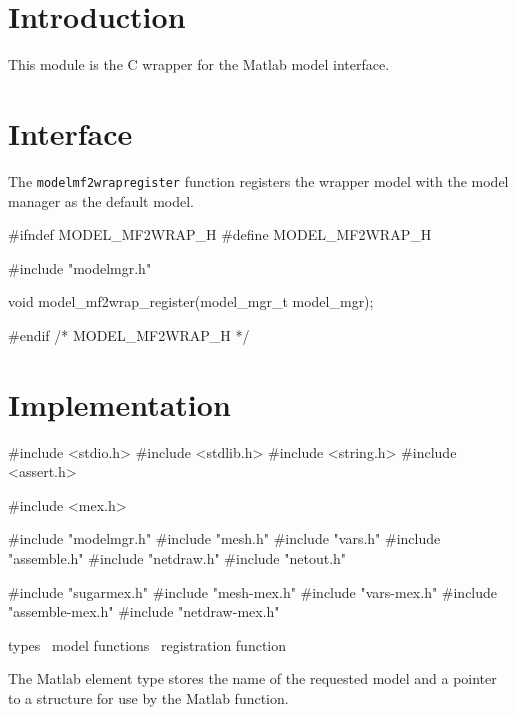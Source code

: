 
\section{Introduction}

This module is the C wrapper for the Matlab model interface.


\section{Interface}

The {\tt{}model{}mf2wrap{}register} function registers the wrapper model with
the model manager as the default model.

\endmoddef
#ifndef MODEL_MF2WRAP_H
#define MODEL_MF2WRAP_H

#include "modelmgr.h"

void model_mf2wrap_register(model_mgr_t model_mgr);

#endif /* MODEL_MF2WRAP_H */
\nwendcode{}\nwdocspar


\section{Implementation}

\nwenddocs{}\endmoddef
#include <stdio.h>
#include <stdlib.h>
#include <string.h>
#include <assert.h>

#include <mex.h>

#include "modelmgr.h"
#include "mesh.h"
#include "vars.h"
#include "assemble.h"
#include "netdraw.h"
#include "netout.h"

#include "sugarmex.h"
#include "mesh-mex.h"
#include "vars-mex.h"
#include "assemble-mex.h"
#include "netdraw-mex.h"

\LA{}types~{\nwtagstyle{}}\RA{}
\LA{}model functions~{\nwtagstyle{}}\RA{}
\LA{}registration function~{\nwtagstyle{}}\RA{}
\nwendcode{}\nwdocspar

The Matlab element type stores the name of the requested model
and a pointer to a structure for use by the Matlab function.


